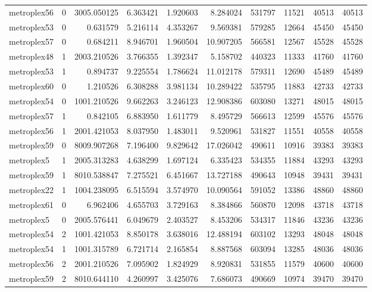 \begin{longtable}{|l|r|r|r|r|r|r|r|r|r|}
metroplex56 & 0 & 3005.050125 & 6.363421 & 1.920603 & 8.284024 & 531797 & 11521 & 40513 & 40513 \\
metroplex53 & 0 & 0.631579 & 5.216114 & 4.353267 & 9.569381 & 579285 & 12664 & 45450 & 45450 \\
metroplex57 & 0 & 0.684211 & 8.946701 & 1.960504 & 10.907205 & 566581 & 12567 & 45528 & 45528 \\
metroplex48 & 1 & 2003.210526 & 3.766355 & 1.392347 & 5.158702 & 440323 & 11333 & 41760 & 41760 \\
metroplex53 & 1 & 0.894737 & 9.225554 & 1.786624 & 11.012178 & 579311 & 12690 & 45489 & 45489 \\
metroplex60 & 0 & 1.210526 & 6.308288 & 3.981134 & 10.289422 & 535795 & 11883 & 42733 & 42733 \\
metroplex54 & 0 & 1001.210526 & 9.662263 & 3.246123 & 12.908386 & 603080 & 13271 & 48015 & 48015 \\
metroplex57 & 1 & 0.842105 & 6.883950 & 1.611779 & 8.495729 & 566613 & 12599 & 45576 & 45576 \\
metroplex56 & 1 & 2001.421053 & 8.037950 & 1.483011 & 9.520961 & 531827 & 11551 & 40558 & 40558 \\
metroplex59 & 0 & 8009.907268 & 7.196400 & 9.829642 & 17.026042 & 490611 & 10916 & 39383 & 39383 \\
metroplex5 & 1 & 2005.313283 & 4.638299 & 1.697124 & 6.335423 & 534355 & 11884 & 43293 & 43293 \\
metroplex59 & 1 & 8010.538847 & 7.275521 & 6.451667 & 13.727188 & 490643 & 10948 & 39431 & 39431 \\
metroplex22 & 1 & 1004.238095 & 6.515594 & 3.574970 & 10.090564 & 591052 & 13386 & 48860 & 48860 \\
metroplex61 & 0 & 6.962406 & 4.655703 & 3.729163 & 8.384866 & 560870 & 12098 & 43718 & 43718 \\
metroplex5 & 0 & 2005.576441 & 6.049679 & 2.403527 & 8.453206 & 534317 & 11846 & 43236 & 43236 \\
metroplex54 & 2 & 1001.421053 & 8.850178 & 3.638016 & 12.488194 & 603102 & 13293 & 48048 & 48048 \\
metroplex54 & 1 & 1001.315789 & 6.721714 & 2.165854 & 8.887568 & 603094 & 13285 & 48036 & 48036 \\
metroplex56 & 2 & 2001.210526 & 7.095902 & 1.824929 & 8.920831 & 531855 & 11579 & 40600 & 40600 \\
metroplex59 & 2 & 8010.644110 & 4.260997 & 3.425076 & 7.686073 & 490669 & 10974 & 39470 & 39470 \\

\end{longtable}
